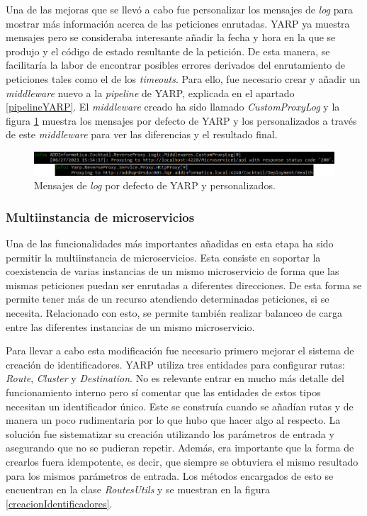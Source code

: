 \documentclass[11pt,spanish,listoffigures]{tfgetsinf}
\begin{document}
Una de las mejoras que se llevó a cabo fue personalizar los mensajes de \emph{log} para mostrar más información acerca de las peticiones enrutadas. YARP ya muestra mensajes pero se consideraba interesante añadir la fecha y hora en la que se produjo y el código de estado resultante de la petición. De esta manera, se facilitaría la labor de encontrar posibles errores derivados del enrutamiento de peticiones tales como el de los \emph{timeouts}. Para ello, fue necesario crear y añadir un \emph{middleware} nuevo a la \emph{pipeline} de YARP, explicada en el apartado \ref{pipelineYARP}. El \emph{middleware} creado ha sido llamado \emph{CustomProxyLog} y la figura \ref{logs} muestra los mensajes por defecto de YARP y los personalizados a través de este \emph{middleware} para ver las diferencias y el resultado final.

\begin{figure}[ht]
\centering
\includegraphics[width=1\textwidth]{imagenes/logs}
\caption{Mensajes de \emph{log} por defecto de YARP y personalizados.}
	\label{logs}
\end{figure}


			\subsubsection{Multiinstancia de microservicios}

Una de las funcionalidades más importantes añadidas en esta etapa ha sido permitir la multiinstancia de microservicios. Esta consiste en soportar la coexistencia de varias instancias de un mismo microservicio de forma que las mismas peticiones puedan ser enrutadas a diferentes direcciones. De esta forma se permite tener más de un recurso atendiendo determinadas peticiones, si se necesita. Relacionado con esto, se permite también realizar balanceo de carga entre las diferentes instancias de un mismo microservicio.

Para llevar a cabo esta modificación fue necesario primero mejorar el sistema de creación de identificadores. YARP utiliza tres entidades para configurar rutas: \emph{Route}, \emph{Cluster} y \emph{Destination}. No es relevante entrar en mucho más detalle del funcionamiento interno pero sí comentar que las entidades de estos tipos necesitan un identificador único. Este se construía cuando se añadían rutas y de manera un poco rudimentaria por lo que hubo que hacer algo al respecto. La solución fue sistematizar su creación utilizando los parámetros de entrada y asegurando que no se pudieran repetir. Además, era importante que la forma de crearlos fuera idempotente, es decir, que siempre se obtuviera el mismo resultado para los mismos parámetros de entrada. Los métodos encargados de esto se encuentran en la clase \emph{RoutesUtils} y se muestran en la figura \ref{creacionIdentificadores}.
\end{document}
